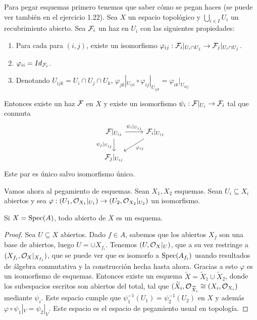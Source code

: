 \documentclass[GA.tex]{subfiles}
\begin{document}
\begin{ej}
Para pegar esquemas primero tenemos que saber cómo se pegan haces (se puede ver también en el ejercicio 1.22). Sea $X$ un espacio topológico y $\bigcup_{i\in I}U_i$ un recubrimiento abierto. Sea $\mathcal{F}_i$ un haz en $U_i$ con las siguientes propiedades:
\begin{enumerate}
 \item
  Para cada para $(i,j)$, existe un isomorfismo $\varphi_{ij}:\mathcal{F}_i|_{U_i\cap U_j}\to\mathcal{F}_j|_{U_i\cap U_j}$. 
 \item $\varphi_{ii}=Id_{\mathcal{F}_i}$.
 \item Denotando $U_{ijk}=U_i\cap U_j\cap U_k$, $\varphi_{jk}|_{U_{ijk}}\circ\varphi_{ij}|_{U_{ijk}}=\varphi_{ik}|_{U_{ikj}}$
 \end{enumerate}
 Entonces existe un haz $\mathcal{F}$ en $X$ y existe un isomorfismo $\psi_i:\mathcal{F}|_{U_i}\to\mathcal{F}_i$ tal que conmuta
 \[
 \begin{tikzcd}
 \calF|_{U_{ij}}\arrow[r, "\psi_i|_{U_{ij}}"]\arrow[d, "\psi_j|_{U_{ij}}"'] &\calF_i|_{U_{ij}}\arrow[dl, "\varphi_{ij}"] \\
 \calF_j|_{U_{ij}} &
 \end{tikzcd}
 \]
 Este par es único salvo isomorfismo único.
 
 Vamos ahora al pegamiento de esquemas. Sean $X_1, X_2$ esquemas. Sean $U_i\subseteq X_i$ abiertos y sea $\varphi:(U_1,{\mathcal O}_{X_1}|_{U_1})\to(U_2,{\mathcal O}_{X_2}|_{U_2})$ un isomorfismo. 
 
\begin{lemma}
Si $X=\operatorname{Spec}(A)$, todo abierto de $X$ es un esquema.
\end{lemma}
\begin{proof}
Sea $U\subseteq X$ abiertos. Dado $f\in A$, sabemos que los abiertos $X_f$ son una base de abiertos, luego $U=\cup X_{f_i}$. Tenemos $(U,{\mathcal O}_X|_U)$, que a su vez restringe a $(X_{f_i}, {\mathcal O}_X|_{X_{f_i}})$, que se puede ver que es isomorfo a $\operatorname{Spec}(A_{f_i})$ usando resultados de álgebra conmutativa y la construcción hecha hasta ahora. Gracias a esto $\varphi$ es un isomorfismo de esquemas. Entonces existe un esquema $\widetilde{X}=\widetilde{X}_1\cup\widetilde{X}_2$, donde los subespacios escritos son abiertos del total, tal que $(\widetilde{X}_i,{\mathcal O}_{\widetilde{X}_i}\cong(X_i,{\mathcal O}_{X_i})$ mediante $\psi_i$. Este espacio cumple que $\psi_1^{-1}(U_1)=\psi^{-1}_2(U_2)$ en $X$ y además $\varphi\circ\psi_1|_V=\psi_2|_V$. Este espacio es el espacio de pegamiento usual en topología. 
\end{proof}
\end{ej}
\end{document}

